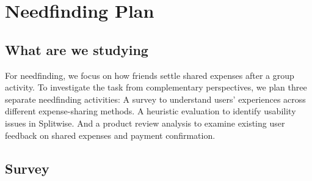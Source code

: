 \documentclass[letterpaper]{jdf}
\begin{document}
\section{Needfinding Plan}
\subsection{What are we studying}

For needfinding, we focus on how friends settle shared expenses after a group activity. To investigate the task from complementary perspectives, we plan three separate needfinding activities: A survey to understand users' experiences across different expense-sharing methods. A heuristic evaluation to identify usability issues in Splitwise. And a product review analysis to examine existing user feedback on shared expenses and payment confirmation.

\subsection{Survey}
\end{document}
